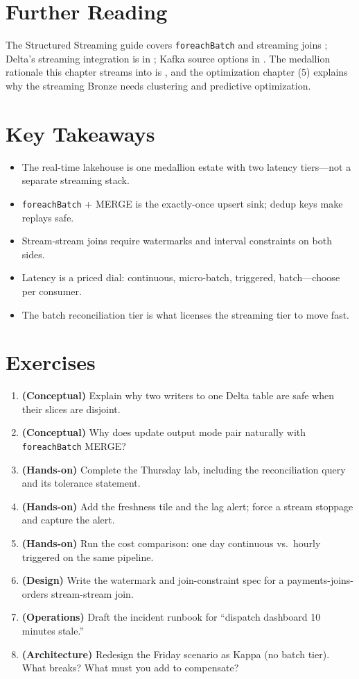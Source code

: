\section{Further Reading}
The Structured Streaming guide covers \texttt{foreachBatch} and streaming joins \cite{sparkStructuredStreaming}; Delta's streaming integration is in \cite{databricksDelta}; Kafka source options in \cite{sparkKafkaIntegration}. The medallion rationale this chapter streams into is \cite{databricksMedallion}, and the optimization chapter (5) explains why the streaming Bronze needs clustering and predictive optimization.

\section*{Key Takeaways}
\begin{itemize}
    \item The real-time lakehouse is one medallion estate with two latency tiers---not a separate streaming stack.
    \item \texttt{foreachBatch} + MERGE is the exactly-once upsert sink; dedup keys make replays safe.
    \item Stream-stream joins require watermarks and interval constraints on both sides.
    \item Latency is a priced dial: continuous, micro-batch, triggered, batch---choose per consumer.
    \item The batch reconciliation tier is what licenses the streaming tier to move fast.
\end{itemize}

\section{Exercises}
\begin{enumerate}
    \item \textbf{(Conceptual)} Explain why two writers to one Delta table are safe when their slices are disjoint.
    \item \textbf{(Conceptual)} Why does update output mode pair naturally with \texttt{foreachBatch} MERGE?
    \item \textbf{(Hands-on)} Complete the Thursday lab, including the reconciliation query and its tolerance statement.
    \item \textbf{(Hands-on)} Add the freshness tile and the lag alert; force a stream stoppage and capture the alert.
    \item \textbf{(Hands-on)} Run the cost comparison: one day continuous vs.\ hourly triggered on the same pipeline.
    \item \textbf{(Design)} Write the watermark and join-constraint spec for a payments-joins-orders stream-stream join.
    \item \textbf{(Operations)} Draft the incident runbook for ``dispatch dashboard 10 minutes stale.''
    \item \textbf{(Architecture)} Redesign the Friday scenario as Kappa (no batch tier). What breaks? What must you add to compensate?
\end{enumerate}

